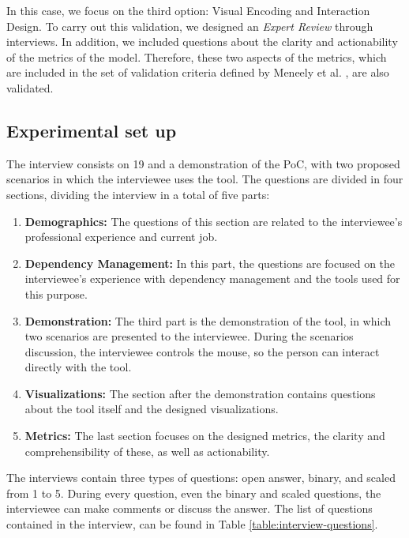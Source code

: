 In this case, we focus on the third option: Visual Encoding and Interaction Design. To carry out this validation, we designed an \textit{Expert Review} through interviews. In addition, we included questions about the clarity and actionability of the metrics of the model. Therefore, these two aspects of the metrics, which are included in the set of validation criteria defined by Meneely et al. \cite{Meneely2012}, are also validated.

\subsection{Experimental set up}
The interview consists on 19 and a demonstration of the PoC, with two proposed scenarios in which the interviewee uses the tool. The questions are divided in four sections, dividing the interview in a total of five parts:

\begin{enumerate}
  \item \textbf{Demographics:} The questions of this section are related to the interviewee's professional experience and current job.
  \item \textbf{Dependency Management:} In this part, the questions are focused on the interviewee's experience with dependency management and the tools used for this purpose.
  \item \textbf{Demonstration:} The third part is the demonstration of the tool, in which two scenarios are presented to the interviewee. During the scenarios discussion, the interviewee controls the mouse, so the person can interact directly with the tool.
  \item \textbf{Visualizations:} The section after the demonstration contains questions about the tool itself and the designed visualizations.
  \item \textbf{Metrics:} The last section focuses on the designed metrics, the clarity and comprehensibility of these, as well as actionability.
\end{enumerate}

The interviews contain three types of questions: open answer, binary, and scaled from 1 to 5. During every question, even the binary and scaled questions, the interviewee can make comments or discuss the answer. The list of questions contained in the interview, can be found in Table \ref{table:interview-questions}.


